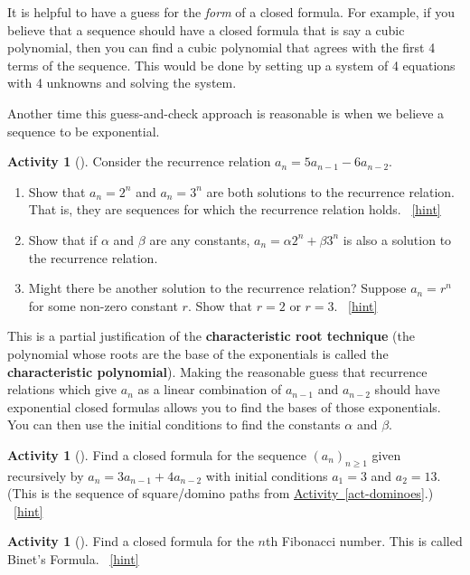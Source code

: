 \documentclass[10pt,]{book}
\newcommand{\terminology}[1]{\textbf{#1}}
\theoremstyle{plain}
\theoremstyle{definition}
\theoremstyle{definition}
\theoremstyle{definition}
\newtheorem{activity}[project]{Activity}
\numberwithin{equation}{chapter}
\begin{document}
\hypertarget{p-514}{}%
It is helpful to have a guess for the \emph{form} of a closed formula.  For example, if you believe that a sequence should have a closed formula that is say a cubic polynomial, then you can find a cubic polynomial that agrees with the first 4 terms of the sequence.  This would be done by setting up a system of 4 equations with 4 unknowns and solving the system.%
\par
\hypertarget{p-515}{}%
Another time this guess-and-check approach is reasonable is when we believe a sequence to be exponential.%
\begin{activity}[]\label{activity-86}
\hypertarget{p-516}{}%
Consider the recurrence relation \(a_n = 5a_{n-1} - 6a_{n-2}\).%
\begin{enumerate}[font=\bfseries,label=(\alph*),ref=\alph*]
\item\label{task-111} \hypertarget{p-517}{}%
Show that \(a_n = 2^n\) and \(a_n = 3^n\) are both solutions to the recurrence relation.  That is, they are sequences for which the recurrence relation holds.%
~\hfill{\tiny\hyperlink{a-86.a}{[hint]}\hypertarget{q-86.a}{}}\item\label{task-112} \hypertarget{p-519}{}%
Show that if \(\alpha\) and \(\beta\) are any constants, \(a_n = \alpha 2^n + \beta 3^n\) is also a solution to the recurrence relation.%
\item\label{task-113} \hypertarget{p-520}{}%
Might there be another solution to the recurrence relation?  Suppose \(a_n = r^n\) for some non-zero constant \(r\).  Show that \(r = 2\) or \(r = 3\).%
~\hfill{\tiny\hyperlink{a-86.c}{[hint]}\hypertarget{q-86.c}{}}\end{enumerate}
\end{activity}
\hypertarget{p-522}{}%
This is a partial justification of the \terminology{characteristic root technique} (the polynomial whose roots are the base of the exponentials is called the \terminology{characteristic polynomial}).  Making the reasonable guess that recurrence relations which give \(a_n\) as a linear combination of \(a_{n-1}\) and \(a_{n-2}\) should have exponential closed formulas allows you to find the bases of those exponentials.  You can then use the initial conditions to find the constants \(\alpha\) and \(\beta\).%
\begin{activity}[]\label{activity-87}
\hypertarget{p-523}{}%
Find a closed formula for the sequence \((a_n)_{n \ge 1}\) given recursively by \(a_n = 3a_{n-1} + 4a_{n-2}\) with initial conditions \(a_1 = 3\) and \(a_2 = 13\).  (This is the sequence of square/domino paths from \hyperref[act-dominoes]{Activity~\ref{act-dominoes}}.)%
~\hfill{\tiny\hyperlink{a-87}{[hint]}\hypertarget{q-87}{}}\end{activity}
\begin{activity}[]\label{act-binet}
\hypertarget{p-525}{}%
Find a closed formula for the \(n\)th Fibonacci number.  This is called Binet's Formula.%
~\hfill{\tiny\hyperlink{a-88}{[hint]}\hypertarget{q-88}{}}\end{activity}
\typeout{************************************************}
\typeout{************************************************}
\end{document}
